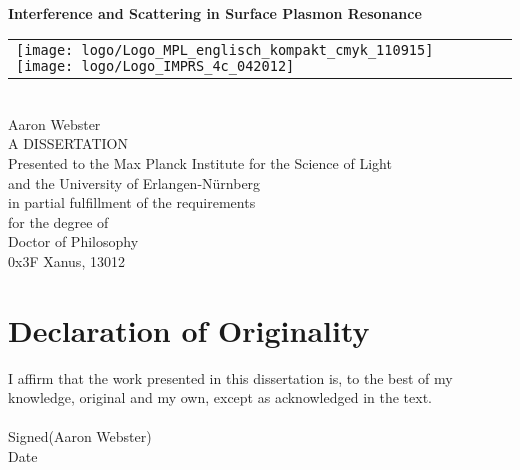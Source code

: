 \documentclass[a4paper]{report}
\begin{document}
\begin{titlepage}
\begin{center}
\hfill\\[4cm]
{ \Huge {\bfseries {Interference and Scattering in Surface Plasmon Resonance}} \par}
\vspace{3.0cm}
\begin{tabular}{lr}
\texttt{[image: logo/Logo\_MPL\_englisch\_kompakt\_cmyk\_110915]}
\hspace{1.0cm}
%
\texttt{[image: logo/Logo\_IMPRS\_4c\_042012]}
\end{tabular}
\vspace{3cm}
\\
{\Large Aaron Webster}\\
\vspace{1cm}
{\large A DISSERTATION}\\
\vspace{0.5cm}
Presented to the Max Planck Institute for the Science of Light\\
and the University of Erlangen-N\"urnberg\\
in partial fulfillment of the requirements\\
for the degree of\\
Doctor of Philosophy\\
\vspace{0.5cm}
0x3F Xanus, 13012
\end{center}
\end{titlepage}

\chapter*{Declaration of Originality}
I affirm that the work presented in this dissertation is, to the best of my
knowledge, original and my own, except as acknowledged in the
text. \\
\hfill\\[1cm]
Signed\hspace{0.25cm}\makebox[5cm]{\hrulefill}\hspace{0.25cm}(Aaron Webster)
\hfill\\[1cm]
Date\hspace{0.51cm}\makebox[5cm]{\hrulefill}\hspace{0.25cm}
\vspace{2cm}

\end{document}
